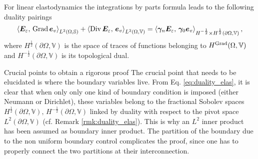 \begin{remark}\label{rmk:duality_elas}
	For linear elastodynamics the integrations by parts formula leads to the following duality pairings \cite[Chapter 1]{boffi2013mixed}
	\begin{equation}\label{eq:duality_elas}
	\inner[L^2(\Omega, \bbS)]{\bm{E}_\varepsilon}{\Grad \bm{e}_v} + \inner[L^2(\Omega, \mathbb{V})]{\Div \bm{E}_\varepsilon}{\bm{e}_v} = \inner[H^{-\frac{1}{2}} \times H^{\frac{1}{2}}(\partial\Omega, \mathbb{V})]{\bm\gamma_{n}\bm{E}_\varepsilon}{\bm\gamma_{0} \bm{e}_v},
	\end{equation}
	where $H^{\frac{1}{2}}(\partial\Omega, \mathbb{V})$ is the space of traces of functions belonging to $H^{\Grad}(\Omega, \mathbb{V})$ and $H^{-\frac{1}{2}}(\partial\Omega, \mathbb{V})$ is its topological dual.
\end{remark}

\begin{paragraph}{Crucial points to obtain a rigorous proof}
	The crucial point that needs to be elucidated is where the boundary variables live. From Eq. \eqref{eq:duality_elas}, it is clear that when only only one kind of boundary condition is imposed (either Neumann or Dirichlet), these variables belong to the fractional Sobolev spaces $H^{\frac{1}{2}}(\partial\Omega, \mathbb{V}), \, H^{-\frac{1}{2}}(\partial\Omega, \mathbb{V})$ linked by duality with respect to the pivot space $L^2(\partial\Omega, \mathbb{V})$ (cf. Remark \ref{rmk:duality_elas}). This is why an $L^2$ inner product has been assumed as boundary inner product. The partition of the boundary due to the non uniform boundary control complicates the proof, since one has to properly connect the two partitions at their interconnection.
\end{paragraph}

